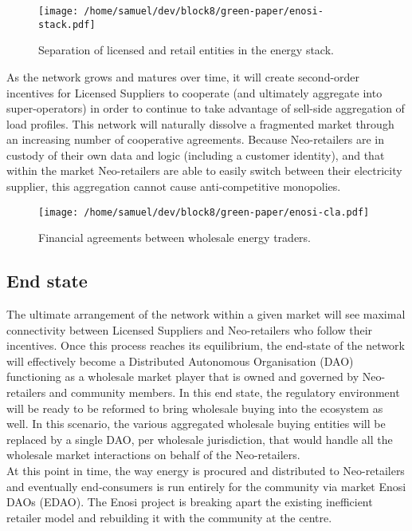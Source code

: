 \documentclass{article}
\theoremstyle{definition}
\theoremstyle{plain} %
\begin{document}
\begin{figure}
\begin{center}
\texttt{[image: /home/samuel/dev/block8/green-paper/enosi-stack.pdf]}
\caption{Separation of licensed and retail entities in the energy stack.}
\end{center}
\end{figure}

\noindent As the network grows and matures over time, it will create second-order incentives for Licensed Suppliers to cooperate (and ultimately aggregate into super-operators) in order to continue to take advantage of sell-side aggregation of load profiles. This network will naturally dissolve a fragmented market through an increasing number of cooperative agreements. Because Neo-retailers are in custody of their own data and logic (including a customer identity), and that within the market Neo-retailers are able to easily switch between their electricity supplier, this aggregation cannot cause anti-competitive monopolies.

\begin{figure}
\begin{center}
\texttt{[image: /home/samuel/dev/block8/green-paper/enosi-cla.pdf]}
\caption{Financial agreements between wholesale energy traders.}	
\end{center}
\end{figure}

\subsection{End state}

The ultimate arrangement of the network within a given market will see maximal connectivity between Licensed Suppliers and Neo-retailers who follow their incentives. Once this process reaches its equilibrium, the end-state of the network will effectively become a Distributed Autonomous Organisation (DAO) functioning as a wholesale market player that is owned and governed by Neo-retailers and community members. In this end state, the regulatory environment will be ready to be reformed to bring wholesale buying into the ecosystem as well. In this scenario, the various aggregated wholesale buying entities will be replaced by a single DAO, per wholesale jurisdiction, that would handle all the wholesale market interactions on behalf of the Neo-retailers. \\

\noindent At this point in time, the way energy is procured and distributed to Neo-retailers and eventually end-consumers is run entirely for the community via market Enosi DAOs (EDAO). The Enosi project is breaking apart the existing inefficient retailer model and rebuilding it with the community at the centre.\\
\end{document}
